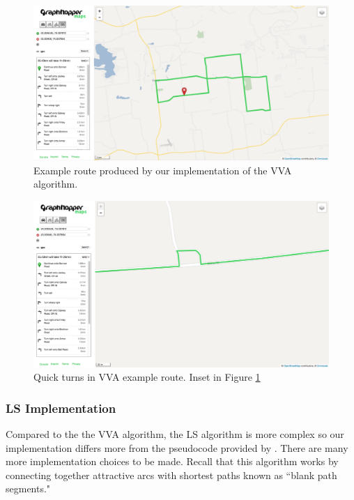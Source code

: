 \documentclass[11pt]{article}
\begin{document}
\begin{figure}
    \begin{center}
        \includegraphics[width=\textwidth]{figs/vva-route}
    \end{center}
    \caption{Example route produced by our implementation of the VVA algorithm.}
    \label{fig:vva-example}
\end{figure}

\begin{figure}
    \begin{center}
        \includegraphics[width=\textwidth]{figs/vva-route-turn}
    \end{center}
    \caption{Quick turns in VVA example route. Inset in Figure \ref{fig:vva-example}}
    \label{fig:vva-example-turn}
\end{figure}


\subsubsection{LS Implementation}
Compared to the the VVA algorithm, the LS algorithm is more complex so our implementation differs more from the pseudocode provided by \citeauthor{lu2015arc}. There are many more implementation choices to be made. Recall that this algorithm works by connecting together attractive arcs with shortest paths known as ``blank path segments." 
\end{document}
